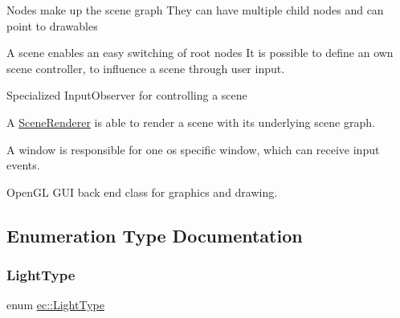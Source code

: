 Nodes make up the scene graph They can have multiple child nodes and can point to drawables

A scene enables an easy switching of root nodes It is possible to define an own scene controller, to influence a scene through user input.

Specialized Input\+Observer for controlling a scene

A \mbox{\hyperlink{classec_1_1_scene_renderer}{Scene\+Renderer}} is able to render a scene with its underlying scene graph.

A window is responsible for one os specific window, which can receive input events.

Open\+GL G\+UI back end class for graphics and drawing. 

\subsection{Enumeration Type Documentation}
\mbox{\label{namespaceec_a30e2a743ebdeb02ac68a6cfa50f629c7}} 
\subsubsection{\texorpdfstring{Light\+Type}{LightType}}
{\footnotesize\ttfamily enum \mbox{\hyperlink{namespaceec_a30e2a743ebdeb02ac68a6cfa50f629c7}{ec\+::\+Light\+Type}}\hspace{0.3cm}{\ttfamily [strong]}}

